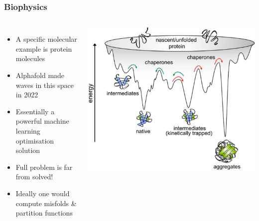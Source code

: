 \documentclass[aspectratio=169]{beamer}
\begin{document}
\begin{frame}
    \frametitle{Biophysics}
    \begin{columns}
        \begin{itemize}
            \item A specific molecular example is protein molecules
            \item Alphafold made waves in this space in 2022
            \item Essentially a powerful machine learning optimisation solution
            \item Full problem is far from solved!
            \item Ideally one would compute misfolds \& partition functions
        \end{itemize}
        
        \includegraphics[width=\textwidth]{figures/proteins}
        
    \end{columns}
\end{frame}
\end{document}

